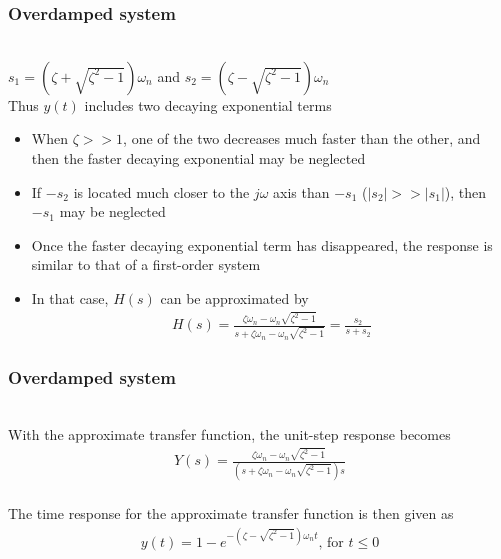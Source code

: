 \begin{frame}
\frametitle{Overdamped system}
\\ $s_1 = (\zeta +\sqrt{\zeta^2 -1})\omega_n$ and $s_2 = (\zeta -\sqrt{\zeta^2 -1})\omega_n$
\vspace{0.3cm}
\\ Thus $y(t)$ includes two decaying exponential terms
\pause
\begin{itemize}
\vspace{0.2cm}
\pause
\item When $\zeta >> 1$, one of the two decreases much faster than the other, and then the faster decaying exponential may be neglected
\vspace{0.2cm}
\pause
\item If $-s_2$ is located much closer to the $j\omega$ axis than $-s_1$ ($|s_2|>>|s_1|$), then $-s_1$ may be neglected
\vspace{0.3cm}
\pause
\item Once the faster decaying exponential term has disappeared, the response is similar to that of a first-order system
\vspace{0.3cm}
\pause
\item In that case, $H(s)$ can be approximated by
\\ 
\begin{align*}
H(s) = \frac{\zeta\omega_n - \omega_n\sqrt{\zeta^2-1}}{s+\zeta\omega_n -\omega_n\sqrt{\zeta^2-1}}=\frac{s_2}{s+s_2}
\end{align*}
\end{itemize}
\end{frame}

\begin{frame}
\frametitle{Overdamped system}
\\ With the approximate transfer function, the unit-step response becomes
\\
\begin{align*}
 Y(s) = \frac{\zeta\omega_n - \omega_n\sqrt{\zeta^2-1}}{(s+\zeta\omega_n -\omega_n\sqrt{\zeta^2-1})s}
\end{align*}
\pause
\\ The time response for the approximate transfer function is then given as
\\ 
\begin{align*}
y(t)= 1 -e^{-(\zeta-\sqrt{\zeta^2 -1})\omega_n t}\text{, for }t\le 0
\end{align*}
\end{frame}

